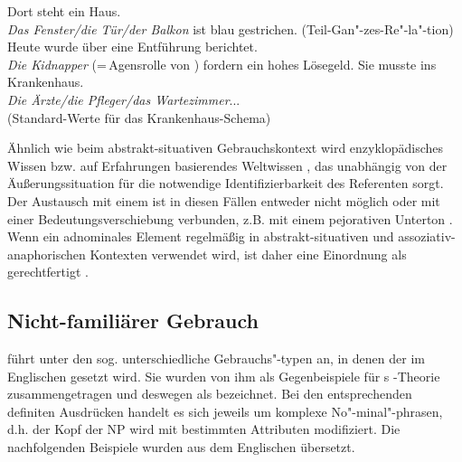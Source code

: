 \begin{exe}
	\ex \label{ex:asso3}   
	\begin{xlist}
		\ex \label{ex:meronymie} Dort steht ein  Haus. \\ \textit{Das Fenster/die Tür/der Balkon} ist blau gestrichen. (Teil-Gan"-zes-Re"-la"-tion)
		\ex \label{ex:rolle} Heute wurde über eine Entführung berichtet. \\ \textit{Die Kidnapper} (=\,Agensrolle  von ) fordern ein hohes Lösegeld.
				\ex \label{ex:krank} Sie musste ins Krankenhaus. \\ \textit{Die Ärzte/die Pfleger/das Wartezimmer}...\\(Standard-Werte für das Krankenhaus-Schema)
		\end{xlist}
\end{exe}

Ähnlich wie beim abstrakt-situativen  Gebrauchskontext wird enzyklopädisches Wissen bzw. auf Erfahrungen basierendes Weltwissen , das unabhängig von der Äußerungssituation für die notwendige Identifizierbarkeit des Referenten sorgt. Der Austausch mit einem  ist in diesen Fällen entweder nicht möglich oder mit einer Bedeutungsverschiebung verbunden, z.B. mit einem pejorativen Unterton \parencite[989]{Hauenschild1993}. Wenn ein adnominales Element regelmäßig in abstrakt-situativen  und assoziativ-anaphorischen  Kontexten verwendet wird, ist daher eine Einordnung als  gerechtfertigt \parencite[190]{Himmelmann1997}.\pagebreak

\subsection{Nicht-familiärer Gebrauch}\label{sec:nicht-fam}

\textcite[130--149]{Hawkins1978} führt unter den sog.  unterschiedliche Gebrauchs"-typen an, in denen der  im Englischen gesetzt wird. Sie wurden von ihm als Gegenbeispiele für \citeauthor{Christophersen1939}s -Theorie zusammengetragen und  deswegen als  bezeichnet. Bei den entsprechenden definiten Ausdrücken handelt es sich jeweils um komplexe  No"-minal"-phrasen, d.h. der Kopf der NP wird mit bestimmten Attributen modifiziert. Die nachfolgenden Beispiele \parencite[vgl. die Übersicht in][37]{Himmelmann1997} wurden aus dem Englischen übersetzt.
 
